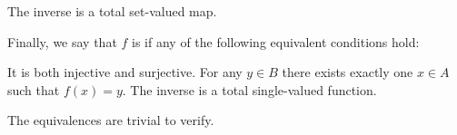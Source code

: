 \begin{definition}
\begin{thmenum}
\begin{minipage}[t]{0.44\textwidth}
\begin{thmenum}[leftmargin=0.9cm]
         The inverse is a total set-valued map.
      \end{thmenum}
    \end{minipage}

     Finally, we say that \( f \) is  if any of the following equivalent conditions hold:
    \begin{thmenum}
       It is both injective and surjective.
       For any \( y \in B \) there exists exactly one \( x \in A \) such that \( f(x) = y \).
       The inverse is a total single-valued function.
    \end{thmenum}
  \end{thmenum}
\end{definition}
\begin{defproof}
  The equivalences are trivial to verify.
\end{defproof}

